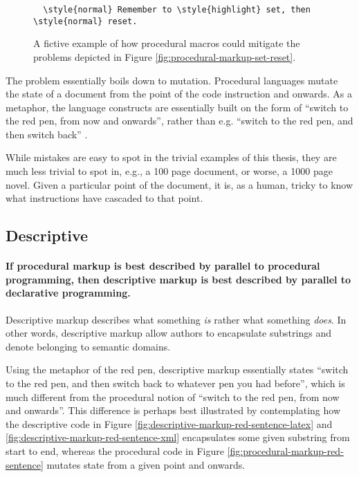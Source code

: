 \documentclass{scrreprt}
\begin{document}
\begin{figure}[h]
\begin{lstlisting}
  \style{normal} Remember to \style{highlight} set, then \style{normal} reset.
\end{lstlisting}
\caption{A fictive example of how procedural macros could mitigate the problems depicted in Figure \ref{fig:procedural-markup-set-reset}.}
\label{fig:procedural-markup-set-reset-macro}
\end{figure}


The problem essentially boils down to mutation. Procedural languages mutate the state of a document from the point of the code instruction and onwards. As a metaphor, the language constructs are essentially built on the form of ``switch to the red pen, from now and onwards'', rather than e.g. ``switch to the red pen, and then switch back'' .

While mistakes are easy to spot in the trivial examples of this thesis, they are much less trivial to spot in, e.g., a 100 page document, or worse, a 1000 page novel. Given a particular point of the document, it is, as a human, tricky to know what instructions have cascaded to that point.




\subsection{Descriptive}
\label{sec:taxonomy-descriptive}
\paragraph{If procedural markup is best described by parallel to procedural programming, then descriptive markup is best described by parallel to declarative programming.} Descriptive markup describes what something \emph{is} rather what something \emph{does}. In other words, descriptive markup allow authors to encapsulate substrings and denote belonging to semantic domains.


Using the metaphor of the red pen, descriptive markup essentially states ``switch to the red pen, and then switch back to whatever pen you had before'', which is much different from the procedural notion of ``switch to the red pen, from now and onwards''. This difference is perhaps best illustrated by contemplating how the descriptive code in Figure \ref{fig:descriptive-markup-red-sentence-latex} and \ref{fig:descriptive-markup-red-sentence-xml} encapsulates some given substring from start to end, whereas the procedural code in Figure \ref{fig:procedural-markup-red-sentence} mutates state from a given point and onwards.
\end{document}
